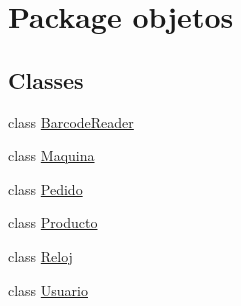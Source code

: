 \hypertarget{namespaceobjetos}{}\section{Package objetos}
\label{namespaceobjetos}
\subsection*{Classes}
\begin{DoxyCompactItemize}
\item 
class \mbox{\hyperlink{classobjetos_1_1_barcode_reader}{Barcode\+Reader}}
\item 
class \mbox{\hyperlink{classobjetos_1_1_maquina}{Maquina}}
\item 
class \mbox{\hyperlink{classobjetos_1_1_pedido}{Pedido}}
\item 
class \mbox{\hyperlink{classobjetos_1_1_producto}{Producto}}
\item 
class \mbox{\hyperlink{classobjetos_1_1_reloj}{Reloj}}
\item 
class \mbox{\hyperlink{classobjetos_1_1_usuario}{Usuario}}
\end{DoxyCompactItemize}
